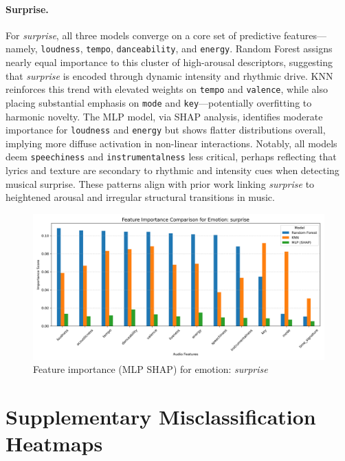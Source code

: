 \documentclass{article}
\begin{document}
\paragraph{Surprise.} For \textit{surprise}, all three models converge on a core set of predictive features—namely, \texttt{loudness}, \texttt{tempo}, \texttt{danceability}, and \texttt{energy}. Random Forest assigns nearly equal importance to this cluster of high-arousal descriptors, suggesting that \textit{surprise} is encoded through dynamic intensity and rhythmic drive. KNN reinforces this trend with elevated weights on \texttt{tempo} and \texttt{valence}, while also placing substantial emphasis on \texttt{mode} and \texttt{key}—potentially overfitting to harmonic novelty. The MLP model, via SHAP analysis, identifies moderate importance for \texttt{loudness} and \texttt{energy} but shows flatter distributions overall, implying more diffuse activation in non-linear interactions. Notably, all models deem \texttt{speechiness} and \texttt{instrumentalness} less critical, perhaps reflecting that lyrics and texture are secondary to rhythmic and intensity cues when detecting musical surprise. These patterns align with prior work linking \textit{surprise} to heightened arousal and irregular structural transitions in music.

\begin{figure}[H]
\centering
\includegraphics[width=\linewidth]{Graphics/per_label/surprise_feature_importance.png}
\caption{Feature importance (MLP SHAP) for emotion: \textit{surprise}}
\label{fig:shap_surprise}
\end{figure}

\newpage

\section{Supplementary Misclassification Heatmaps}
\label{appendix:error_analysis_heatmaps}
\end{document}
